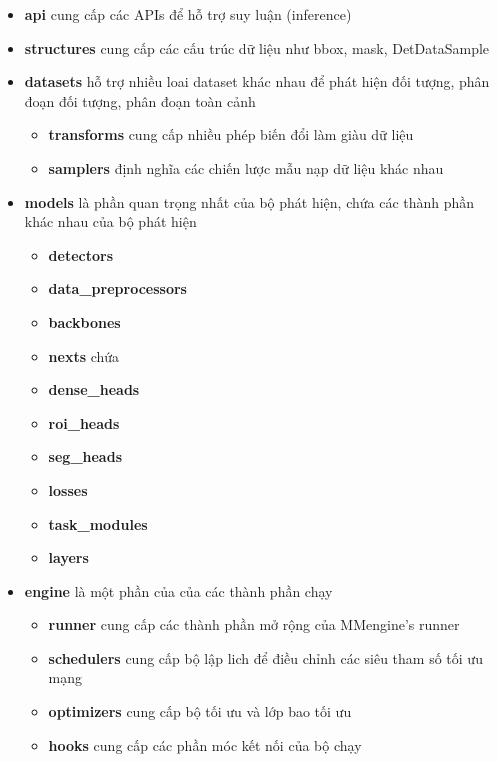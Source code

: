 \documentclass[12pt,a4paper,openany,oneside]{report}
\begin{document}
\begin{itemize}
	\item \textbf{api} cung cấp các APIs để hỗ trợ suy luận (inference)
	\item \textbf{structures} cung cấp các cấu trúc dữ liệu như bbox, mask, DetDataSample
	\item \textbf{datasets} hỗ trợ nhiều loai dataset khác nhau để phát hiện đối tượng, phân đoạn đối tượng, phân đoạn toàn cảnh
	\begin{itemize}
		\item \textbf{transforms} cung cấp nhiều phép biến đổi làm giàu dữ liệu
	   \item \textbf{samplers} định nghĩa các chiến lược mẫu nạp dữ liệu khác nhau
	\end{itemize}

	\item \textbf{models} là phần quan trọng nhất của bộ phát hiện, chứa các thành phần khác nhau của bộ phát hiện
	\begin{itemize}
	\item \textbf{detectors} 
	\item \textbf{data\_preprocessors} 
	\item \textbf{backbones}  
	\item \textbf{nexts} chứa  
	\item \textbf{dense\_heads} 
	\item \textbf{roi\_heads}  
	\item \textbf{seg\_heads}  
	\item \textbf{losses} 
	\item \textbf{task\_modules} 
	\item \textbf{layers} 
	\end{itemize}
	\item \textbf{engine} là một phần của của các thành phần chạy
	\begin{itemize}
		\item \textbf{runner} cung cấp các thành phần mở rộng của MMengine's runner
		\item \textbf{schedulers} cung cấp bộ lập lich để điều chỉnh các siêu tham số tối ưu mạng
		\item \textbf{optimizers} cung cấp bộ tối ưu và lớp bao tối ưu
		\item \textbf{hooks} cung cấp các phần móc kết nối của bộ chạy
		

\end{itemize}
\end{itemize}
\end{document}
